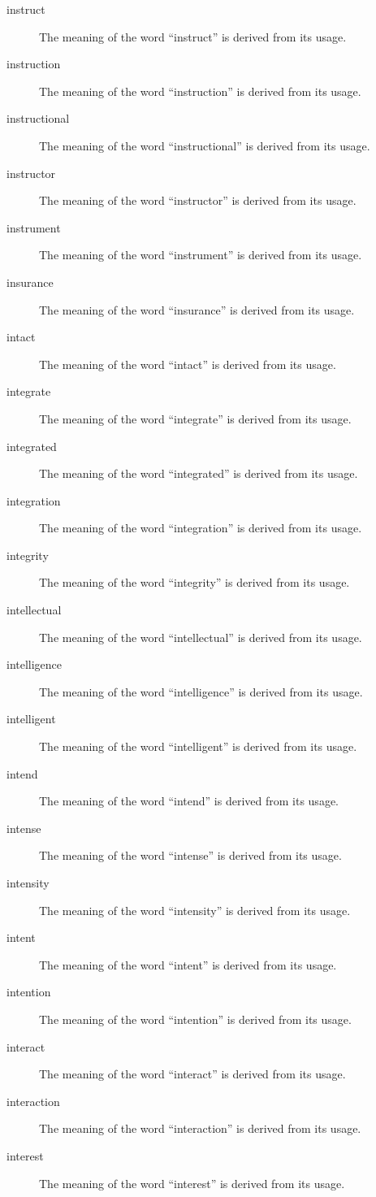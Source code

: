 \documentclass[12pt, letterpaper]{memoir}
\begin{document}
\begin{description}
\item[instruct] The meaning of the word ``instruct'' is derived from its usage.
\item[instruction] The meaning of the word ``instruction'' is derived from its usage.
\item[instructional] The meaning of the word ``instructional'' is derived from its usage.
\item[instructor] The meaning of the word ``instructor'' is derived from its usage.
\item[instrument] The meaning of the word ``instrument'' is derived from its usage.
\item[insurance] The meaning of the word ``insurance'' is derived from its usage.
\item[intact] The meaning of the word ``intact'' is derived from its usage.
\item[integrate] The meaning of the word ``integrate'' is derived from its usage.
\item[integrated] The meaning of the word ``integrated'' is derived from its usage.
\item[integration] The meaning of the word ``integration'' is derived from its usage.
\item[integrity] The meaning of the word ``integrity'' is derived from its usage.
\item[intellectual] The meaning of the word ``intellectual'' is derived from its usage.
\item[intelligence] The meaning of the word ``intelligence'' is derived from its usage.
\item[intelligent] The meaning of the word ``intelligent'' is derived from its usage.
\item[intend] The meaning of the word ``intend'' is derived from its usage.
\item[intense] The meaning of the word ``intense'' is derived from its usage.
\item[intensity] The meaning of the word ``intensity'' is derived from its usage.
\item[intent] The meaning of the word ``intent'' is derived from its usage.
\item[intention] The meaning of the word ``intention'' is derived from its usage.
\item[interact] The meaning of the word ``interact'' is derived from its usage.
\item[interaction] The meaning of the word ``interaction'' is derived from its usage.
\item[interest] The meaning of the word ``interest'' is derived from its usage.

\end{description}
\end{document}
